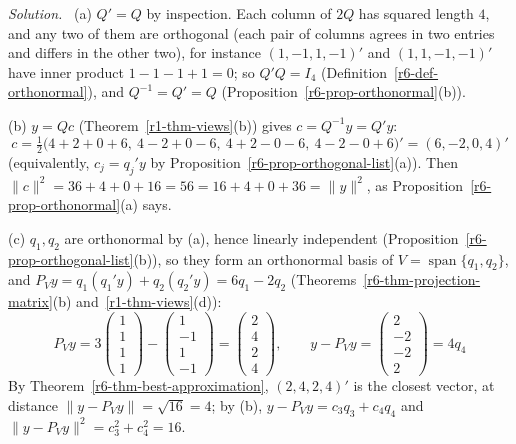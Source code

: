 \documentclass[12pt]{article}
\DeclareMathOperator{\Span}{span}
\theoremstyle{definition}
\newenvironment{solution}{\par\noindent\textit{Solution.}\ }{\par\smallskip}
\begin{document}
\begin{solution}
(a) \(Q'=Q\) by inspection. Each column of \(2Q\) has squared length \(4\), and any two of them are orthogonal
(each pair of columns agrees in two entries and differs in the other two), for
instance \((1,-1,1,-1)'\) and \((1,1,-1,-1)'\) have inner product \(1-1-1+1=0\); so \(Q'Q=I_4\) (Definition~\ref{r6-def-orthonormal}), and
\(Q^{-1}=Q'=Q\) (Proposition~\ref{r6-prop-orthonormal}(b)).

(b) \(y=Qc\) (Theorem~\ref{r1-thm-views}(b)) gives \(c=Q^{-1}y=Q'y\):
\[
c=\tfrac12\bigl(4+2+0+6,\ 4-2+0-6,\ 4+2-0-6,\ 4-2-0+6\bigr)'=(6,-2,0,4)'
\]
(equivalently, \(c_j=q_j'y\) by Proposition~\ref{r6-prop-orthogonal-list}(a)). Then
\(\lVert c\rVert^2=36+4+0+16=56=16+4+0+36=\lVert y\rVert^2\), as Proposition~\ref{r6-prop-orthonormal}(a) says.

(c) \(q_1,q_2\) are orthonormal by (a), hence linearly independent (Proposition~\ref{r6-prop-orthogonal-list}(b)),
so they form an orthonormal basis of \(V=\Span\{q_1,q_2\}\), and
\(P_Vy=q_1(q_1'y)+q_2(q_2'y)=6q_1-2q_2\) (Theorems~\ref{r6-thm-projection-matrix}(b) and~\ref{r1-thm-views}(d)):
\[
P_Vy=3\begin{pmatrix}1\\1\\1\\1\end{pmatrix}-\begin{pmatrix}1\\-1\\1\\-1\end{pmatrix}=\begin{pmatrix}2\\4\\2\\4\end{pmatrix},\qquad
y-P_Vy=\begin{pmatrix}2\\-2\\-2\\2\end{pmatrix}=4q_4
\]
By Theorem~\ref{r6-thm-best-approximation}, \((2,4,2,4)'\) is the closest vector, at distance
\(\lVert y-P_Vy\rVert=\sqrt{16}=4\); by (b), \(y-P_Vy=c_3q_3+c_4q_4\) and \(\lVert y-P_Vy\rVert^2=c_3^2+c_4^2=16\).
\end{solution}
\end{document}
